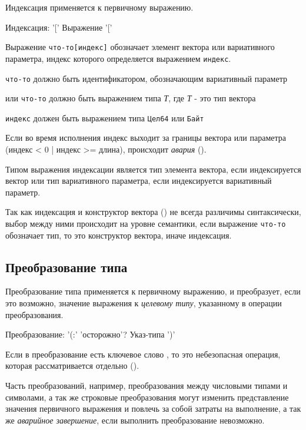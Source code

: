 Индексация применяется к первичному выражению.

\begin{Grammar}
Индексация: '[' Выражение '['
\end{Grammar}    

Выражение \verb|что-то[индекс]| обозначает элемент вектора или вариативного параметра, индекс которого определяется выражением \verb|индекс|.
\begin{d_itemize}
\item
    \verb|что-то| должно быть идентификатором, обозначающим вариативный параметр
\item
    или \verb|что-то| должно быть выражением типа \emph{Т}, где \emph{Т} - это тип вектора
\item
    \verb|индекс| должен быть выражением типа \verb|Цел64| или \verb|Байт|
\end{d_itemize}

Если во время исполнения индекс выходит за границы вектора или параметра (индекс < 0 | индекс >= длина), происходит \emph{авария} ().

Типом выражения индексации является тип элемента вектора, если индексируется вектор или тип вариативного параметра, если индексируется вариативный параметр.

Так как индексация и конструктор вектора () не всегда различимы синтаксически, выбор между ними происходит на уровне семантики, 
если выражение \verb|что-то|  обозначает тип, то это конструктор вектора, иначе индексация.

\hypertarget{conversion}{%
\subsection{Преобразование типа}\label{expr:conversion}}

Преобразование типа применяется к первичному выражению, и преобразует, если это возможно, значение выражения к \emph{целевому типу}, указанному в операции преобразования.

\begin{Grammar}
Преобразование: '(:' 'осторожно'? Указ-типа ')'
\end{Grammar}   

Если в преобразование есть ключевое слово , то это небезопасная операция, которая рассматривается отдельно ().

Часть преобразований, например, преобразования между числовыми типами и символами, а так же строковые преобразования могут изменить 
представление значения первичного выражения и повлечь за собой затраты на выполнение, а так же \emph{аварийное завершение}, если выполнить преобразование невозможно.

